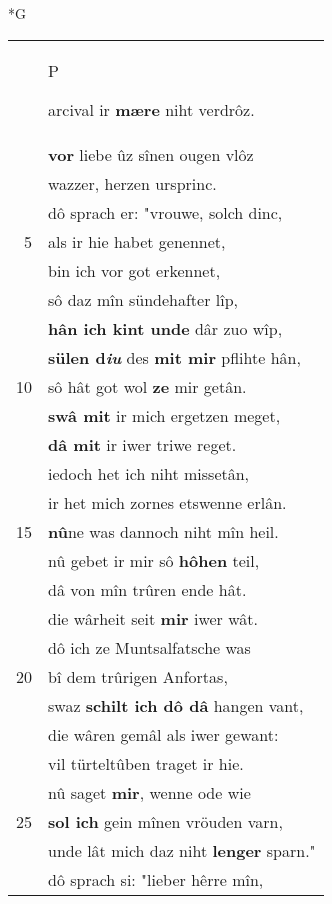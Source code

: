 \documentclass[8pt,a4paper,notitlepage]{article}
\begin{document}
\newpage
\begin{table}[ht]
\begin{minipage}[t]{0.5\linewidth}
\small
\begin{center}*G
\end{center}
\begin{tabular}{rl}
 & \begin{large}P\end{large}arcival ir \textbf{mære} niht verdrôz.\\ 
 & \textbf{vor} liebe ûz sînen ougen vlôz\\ 
 & wazzer, herzen ursprinc.\\ 
 & dô sprach er: "vrouwe, solch dinc,\\ 
5 & als ir hie habet genennet,\\ 
 & bin ich vor got erkennet,\\ 
 & sô daz mîn sündehafter lîp,\\ 
 & \textbf{hân ich kint unde} dâr zuo wîp,\\ 
 & \textbf{sülen d\textit{iu}} des \textbf{mit mir} pflihte hân,\\ 
10 & sô hât got wol \textbf{ze} mir getân.\\ 
 & \textbf{swâ mit} ir mich ergetzen meget,\\ 
 & \textbf{dâ mit} ir iwer triwe reget.\\ 
 & iedoch het ich niht missetân,\\ 
 & ir het mich zornes etswenne erlân.\\ 
15 & \textbf{nû}ne was dannoch niht mîn heil.\\ 
 & nû gebet ir mir sô \textbf{hôhen} teil,\\ 
 & dâ von mîn trûren ende hât.\\ 
 & die wârheit seit \textbf{mir} iwer wât.\\ 
 & dô ich ze Muntsalfatsche was\\ 
20 & bî dem trûrigen Anfortas,\\ 
 & swaz \textbf{schilt ich dô dâ} hangen vant,\\ 
 & die wâren gemâl als iwer gewant:\\ 
 & vil türteltûben traget ir hie.\\ 
 & nû saget \textbf{mir}, wenne ode wie\\ 
25 & \textbf{sol ich} gein mînen vröuden varn,\\ 
 & unde lât mich daz niht \textbf{lenger} sparn."\\ 
 & dô sprach si: "lieber hêrre mîn,\\ 

\end{tabular}
\end{minipage}
\end{table}
\end{document}
